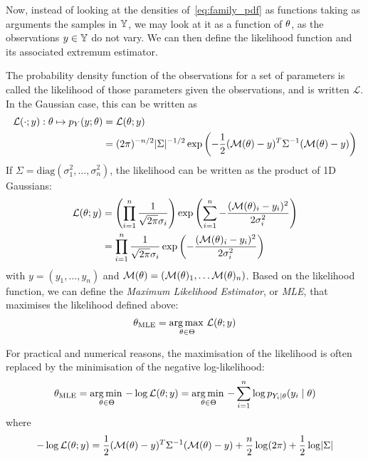 \documentclass[../../Main_ManuscritThese.tex]{subfiles}
\begin{document}
Now, instead of looking at the densities of~\cref{eq:family_pdf} as
functions taking as arguments the samples in $\mathbb{Y}$, we may look at
it as a function of $\theta$, as the observations $y\in\mathbb{Y}$ do not
vary. We can then define the likelihood function and its associated
extremum estimator.
\begin{definition}
  \label{def:mle}
  The probability density function of the observations for a set of
  parameters is called the likelihood of those parameters given the
  observations, and is written $\mathcal{L}$. In the Gaussian case,
  this can be written as
  \begin{align}
    \label{eq:likelihood_definition}
    \mathcal{L}(\cdot ;y): \theta \mapsto p_{Y}(y;\theta) &= \mathcal{L}(\theta;y) \\
    &=(2\pi)^{-n/2}\lvert \Sigma \rvert^{-1/2}\exp\left(-\frac{1}{2}(\mathcal{M}(\theta) - y)^T\Sigma^{-1}(\mathcal{M}(\theta) - y)\right)
  \end{align}
  If $\Sigma = \mathrm{diag}(\sigma^2_1,\dots, \sigma^2_n)$, the
  likelihood can be written as the product of 1D Gaussians:
  \begin{align}
    \mathcal{L}(\theta;y) &= \left(\prod_{i=1}^n\frac{1}{\sqrt{2\pi}\sigma_i}\right)\exp\left(\sum_{i=1}^n -\frac{(\mathcal{M}(\theta)_i - y_i)^2}{2\sigma^2_i}\right) \\
                          &= \prod_{i=1}^n\frac{1}{\sqrt{2\pi}\sigma_i}\exp\left(-\frac{(\mathcal{M}(\theta)_i - y_i)^2}{2\sigma^2_i}\right)
  \end{align}
  with $y = (y_1, \dots, y_n)$ and
  $\mathcal{M}(\theta) = (\mathcal{M}(\theta)_1,\dots \mathcal{M}(\theta)_n)$.
  Based on the likelihood function, we can define the \emph{Maximum
    Likelihood Estimator}, or \emph{MLE}, that maximises the
  likelihood defined above:
  \begin{equation}
    \label{eq:def_MLE}
    {\theta}_{\mathrm{MLE}} = \operatorname*{arg\,max \,}_{\theta\in\Theta}\mathcal{L}(\theta;y)
  \end{equation}

\end{definition}
For practical and numerical reasons, the maximisation of the
likelihood is often replaced by the minimisation of the negative
log-likelihood:
  \begin{equation}
    \label{eq:MLE_iid}
    {\theta}_{\mathrm{MLE}} = \operatorname*{arg\,min \,}_{\theta \in \Theta} -\log \mathcal{L}(\theta;y)= \operatorname*{arg\,min \,}_{\theta \in \Theta} -\sum_{i=1}^n\log p_{Y_i\mid \theta}(y_i \mid \theta) 
  \end{equation} 
  where
  \begin{equation}
    -\log\mathcal{L}(\theta;y) = \frac{1}{2}(\mathcal{M}(\theta) - y)^T\Sigma^{-1}(\mathcal{M}(\theta) - y)+  \frac{n}{2}\log(2\pi) + \frac{1}{2}\log\lvert \Sigma \rvert
  \end{equation}
\end{document}
